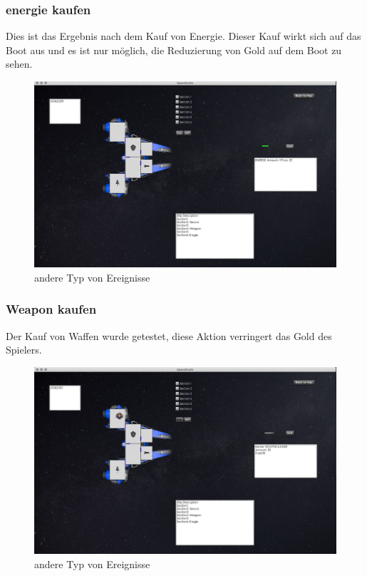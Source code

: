 \documentclass[12pt]{article}
\begin{document}
\subsubsection{energie kaufen}
Dies ist das Ergebnis nach dem Kauf von Energie. Dieser Kauf wirkt sich auf das Boot aus und es ist nur möglich, die Reduzierung von Gold auf dem Boot zu sehen.
\begin{figure}[htp]
\centering
\includegraphics[scale=0.3]{TestProtocolBilder/energie.png}
\caption{andere Typ von Ereignisse}
\end{figure}
\newpage
\subsubsection{Weapon kaufen}
Der Kauf von Waffen wurde getestet, diese Aktion verringert das Gold des Spielers.    
\begin{figure}[htp]
\centering
\includegraphics[scale=0.3]{TestProtocolBilder/weaponkaufen.png}
\caption{andere Typ von Ereignisse}
\end{figure}
\newpage
\end{document}
